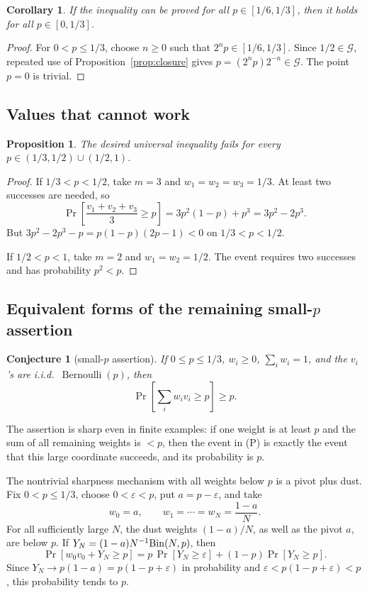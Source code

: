 \documentclass[12pt]{article}
\newtheorem{proposition}{Proposition}
\newtheorem{corollary}{Corollary}
\newtheorem{conjecture}{Conjecture}
\newcommand{\Ber}{\operatorname{Bernoulli}}
\begin{document}
\begin{corollary}\label{cor:base}
If the inequality can be proved for all \(p\in[1/6,1/3]\), then it holds for
all \(p\in[0,1/3]\).
\end{corollary}

\begin{proof}
For \(0<p\le1/3\), choose \(n\ge0\) such that \(2^n p\in[1/6,1/3]\).  Since
\(1/2\in\mathcal G\), repeated use of Proposition~\ref{prop:closure} gives
\(p=(2^n p)2^{-n}\in\mathcal G\).  The point \(p=0\) is trivial.
\end{proof}

\subsection*{Values that cannot work}

\begin{proposition}\label{prop:negative}
The desired universal inequality fails for every
\(p\in(1/3,1/2)\cup(1/2,1)\).
\end{proposition}

\begin{proof}
If \(1/3<p<1/2\), take \(m=3\) and \(w_1=w_2=w_3=1/3\).  At least two
successes are needed, so
\[
\Pr\!\left[\frac{v_1+v_2+v_3}{3}\ge p\right]
  =3p^2(1-p)+p^3
  =3p^2-2p^3 .
\]
But \(3p^2-2p^3-p=p(1-p)(2p-1)<0\) on \(1/3<p<1/2\).

If \(1/2<p<1\), take \(m=2\) and \(w_1=w_2=1/2\).  The event requires two
successes and has probability \(p^2<p\).
\end{proof}

\subsection*{Equivalent forms of the remaining small-\(p\) assertion}

\begin{conjecture}[small-\(p\) assertion]\label{conj:missing}
If \(0\le p\le1/3\), \(w_i\ge0\), \(\sum_iw_i=1\), and the \(v_i\)'s are
i.i.d.\ \(\Ber(p)\), then
\[
   \Pr\!\left[\sum_i w_i v_i\ge p\right]\ge p .
\]
\end{conjecture}

The assertion is sharp even in finite examples: if one weight is at least \(p\) and
the sum of all remaining weights is \(<p\), then the event in (P) is exactly
the event that this large coordinate succeeds, and its probability is \(p\).

The nontrivial sharpness mechanism with all weights below \(p\) is a pivot plus
dust.  Fix \(0<p\le1/3\), choose \(0<\varepsilon<p\), put
\(a=p-\varepsilon\), and take
\[
   w_0=a,\qquad
   w_1=\cdots=w_N=\frac{1-a}{N}.
\]
For all sufficiently large \(N\), the dust weights \((1-a)/N\), as well as the
pivot \(a\), are below \(p\).
If \(Y_N=(1-a)N^{-1}{\rm Bin}(N,p)\), then
\[
 \Pr\!\left[w_0v_0+Y_N\ge p\right]
 =
 p\,\Pr[Y_N\ge\varepsilon]+(1-p)\Pr[Y_N\ge p].
\]
Since \(Y_N\to p(1-a)=p(1-p+\varepsilon)\) in probability and
\(\varepsilon<p(1-p+\varepsilon)<p\), this probability tends to \(p\).
\end{document}
